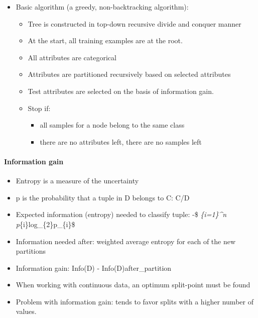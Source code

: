 \documentclass[11pt]{article}
\providecommand{\tightlist}{%
      \setlength{\itemsep}{0pt}\setlength{\parskip}{0pt}}
\begin{document}
    \begin{itemize}
\tightlist
\item
  Basic algorithm (a greedy, non-backtracking algorithm):

  \begin{itemize}
  \tightlist
  \item
    Tree is constructed in top-down recursive divide and conquer manner
  \item
    At the start, all training examples are at the root.
  \item
    All attributes are categorical
  \item
    Attributes are partitioned recursively based on selected attributes
  \item
    Test attributes are selected on the basis of information gain.
  \item
    Stop if:

    \begin{itemize}
    \tightlist
    \item
      all samples for a node belong to the same class
    \item
      there are no attributes left, there are no samples left
    \end{itemize}
  \end{itemize}
\end{itemize}

    \paragraph{Information gain}\label{information-gain}

    \begin{itemize}
\tightlist
\item
  Entropy is a measure of the uncertainty
\item
  p is the probability that a tuple in D belongs to C:
  \textbar{}C\textbar{}/\textbar{}D\textbar{}
\item
  Expected information (entropy) needed to classify tuple: -\$
  \sum\emph{\{i=1\}\^{}n p}\{i\}log\_\{2\}p\_\{i\}\$
\item
  Information needed after: weighted average entropy for each of the new
  partitions
\item
  Information gain: Info(D) - Info(D)after\_partition
\item
  When working with continuous data, an optimum split-point must be
  found
\item
  Problem with information gain: tends to favor splits with a higher
  number of values.
\end{itemize}
\end{document}
